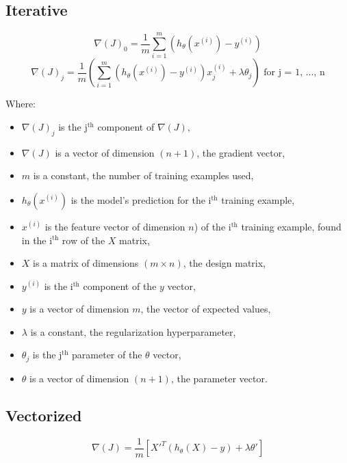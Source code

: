 \documentclass{42-en}
\begin{document}
\subsection*{Iterative}

$$
\nabla(J)_0 = \frac{1}{m}\sum_{i=1}^{m}(h_\theta(x^{(i)}) - y^{(i)})
$$
$$
\nabla(J)_j = \frac{1}{m}\left(\sum_{i=1}^{m}(h_\theta(x^{(i)}) - y^{(i)})x_j^{(i)} + \lambda \theta_j\right) \text{ for j = 1, ..., n}
$$

Where:
\begin{itemize}
  \item $\nabla(J)_j$ is the j$^\text{th}$ component of $\nabla(J)$,
  \item $\nabla(J)$ is a vector of dimension $(n + 1)$, the gradient vector,
  \item $m$ is a constant, the number of training examples used,
  \item $h_\theta(x^{(i)})$ is the model's prediction for the i$^\text{th}$ training example,
  \item $x^{(i)}$ is the feature vector of dimension $n$) of the i$^\text{th}$ training example, found in the i$^\text{th}$ row of the $X$ matrix,
  \item $X$ is a matrix of dimensions $(m \times n)$, the design matrix,
  \item $y^{(i)}$ is the i$^\text{th}$ component of the $y$ vector,
  \item $y$ is a vector of dimension $m$, the vector of expected values,
  \item $\lambda$ is a constant, the regularization hyperparameter,
  \item $\theta_j$ is the j$^\text{th}$ parameter of the $\theta$ vector,
  \item $\theta$ is a vector of dimension $(n + 1)$, the parameter vector.
\end{itemize}

\subsection*{Vectorized}
$$
\nabla(J) = \frac{1}{m} [X'^T(h_\theta(X) - y) + \lambda \theta']
$$  
\end{document}
